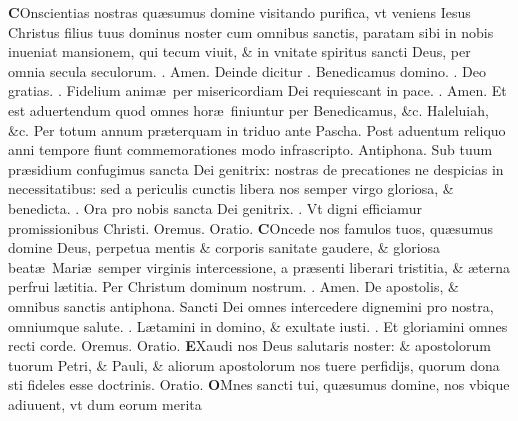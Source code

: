 \documentclass[a5paper,10pt]{book}
\makeatletter
\DeclareRobustCommand{\Vbar}{\vers@resp{-0.1em}{V}}
\DeclareRobustCommand{\Rbar}{\vers@resp{0pt}{R}}
\newcommand{\vers@resp@sym}{\raisebox{0.2ex}{\rotatebox[origin=c]{-20}{$\m@th\rceil$}}}
\newcommand{\vers@resp}[2]{%
  {\ooalign{\hidewidth\kern#1\vers@resp@sym\hidewidth\cr#2\cr}}%
}%
\def\ae{æ}
\makeatother
\begin{document}
\begin{multicols*}{2}
\vspace{-.5em}
\lettrine[lines=2]{\bfseries \color{red} C}{}Onscientias nostras qu\ae sumus domine visitando purifica, vt veniens Iesus Christus filius tuus dominus noster cum omnibus sanctis, paratam sibi in nobis inueniat mansionem, qui tecum viuit, \& in vnitate spiritus sancti Deus, per omnia secula seculorum. \color{red} \Rbar . \color{black} Amen.
\newline \color{red} Deinde dicitur \Vbar . \color{black} Benedicamus domino. \color{red} \Rbar. \color{black} Deo gratias. \color{red} \Vbar . \color{black} Fidelium anim\ae \ per misericordiam Dei requiescant in pace. \color{red} \Rbar . \color{black} Amen.
\newline \color{red} Et est aduertendum quod omnes hor\ae \ finiuntur per \color{black} Benedicamus, \&c. Haleluiah, \color{red} \&c. Per totum annum pr\ae terquam in triduo ante Pascha. Post aduentum reliquo anni tempore fiunt commemorationes modo infrascripto. Antiphona. \color{black}
Sub tuum pr\ae sidium confugimus sancta Dei genitrix: nostras de precationes ne despicias in necessitatibus: sed a periculis cunctis libera nos semper virgo gloriosa, \& benedicta. \color{red} \Vbar . \color{black} Ora pro nobis sancta Dei genitrix. \color{red} \Rbar . \color{black} Vt digni efficiamur promissionibus Christi. \color{red} O\color{black}remus. \color{red} Oratio. \color{black}
\vspace{-.25em}
\lettrine[lines=2]{\bfseries C}{}Oncede nos famulos tuos, qu\ae sumus domine Deus, perpetua mentis \& corporis sanitate gaudere, \& gloriosa beat\ae \ Mari\ae \ semper virginis intercessione, a pr\ae senti liberari tristitia, \& \ae terna perfrui l\ae titia. Per Christum dominum nostrum. \color{red} \Rbar . \color{black} Amen.
\newline \color{red} De apostolis, \& omnibus sanctis antiphona. \color{black} Sancti Dei omnes intercedere dignemini pro nostra, omniumque salute. \color{red} \Vbar . \color{black} L\ae tamini in domino, \& exultate iusti. \color{red} \Rbar . \color{black} Et gloriamini omnes recti corde. \color{red} O\color{black}remus. \color{red} Oratio. \color{black}
\vspace{-.25em}
\lettrine[lines=2]{\bfseries \color{red} E}{}Xaudi nos Deus salutaris noster: \& apostolorum tuorum Petri, \& Pauli, \& aliorum apostolorum nos tuere perfidijs, %
quorum dona sti fideles esse doctrinis. \color{red} Oratio. \color{black}
\vspace{-.25em}
\lettrine[lines=2]{\bfseries \color{red} O}{}Mnes sancti tui, qu\ae sumus domine, nos vbique adiuuent, vt dum eorum merita

\end{multicols*}
\end{document}
